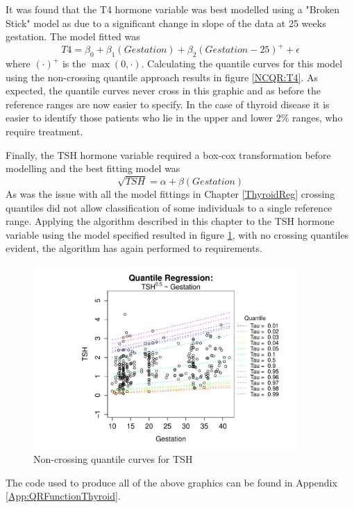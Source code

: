 \documentclass[12pt,a4paper]{report}
\begin{document}
It was found that the T4 hormone variable was best modelled using a "Broken Stick" model as due to a significant change in slope of the data at 25 weeks gestation. The model fitted was
$$T4=\beta_{0}+\beta_{1}(Gestation)+\beta_{2}(Gestation-25)^{+}+\epsilon$$
where $(\cdot)^{+}$ is the $\max(0,\cdot)$.
Calculating the quantile curves for this model using the non-crossing quantile approach results in figure \ref{NCQR:T4}. As expected, the quantile curves never cross in this graphic and as before the reference ranges are now easier to specify. In the case of thyroid disease it is easier to identify those patients who lie in the upper and lower $2\%$ ranges, who require treatment.
\vspace{2mm}

Finally, the TSH hormone variable required a box-cox transformation before modelling and the best fitting model was
$$ \sqrt{TSH} = \alpha + \beta(Gestation)$$
As was the issue with all the model fittings in Chapter \ref{ThyroidReg} crossing quantiles did not allow classification of some individuals to a single reference range. Applying the algorithm described in this chapter to the TSH hormone variable using the model specified resulted in figure \ref{NCQR:TSH}, with no crossing quantiles evident, the algorithm has again performed to requirements.
\vspace{2mm}
\begin{figure}[ht]\centering
    \includegraphics[width=10cm]{QRTSHNCModel.pdf}
    \caption{Non-crossing quantile curves for TSH}
    \label{NCQR:TSH}
\end{figure}
\vspace{2mm}

\par\noindent
The code used to produce all of the above graphics can be found in Appendix \ref{App:QRFunctionThyroid}.
\end{document}

